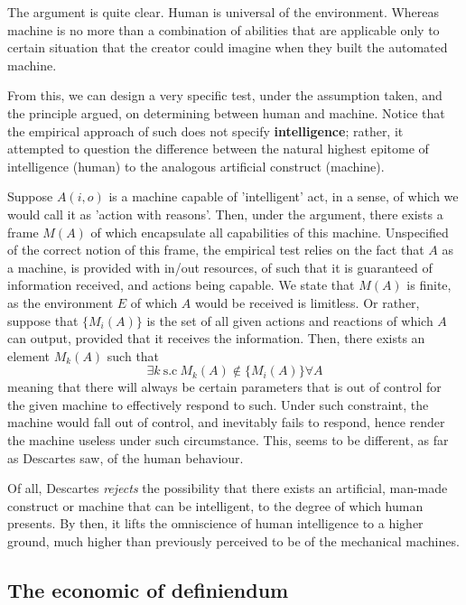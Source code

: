 The argument is quite clear. Human is universal of the environment. Whereas machine is no more than a combination of abilities that are applicable only to certain situation that the creator could imagine when they built the automated machine. 

From this, we can design a very specific test, under the assumption taken, and the principle argued, on determining between human and machine. Notice that the empirical approach of such does not specify \textbf{intelligence}; rather, it attempted to question the difference between the natural highest epitome of intelligence (human) to the analogous artificial construct (machine). 

Suppose $A(i,o)$ is a machine capable of 'intelligent' act, in a sense, of which we would call it as 'action with reasons'. Then, under the argument, there exists a frame $M(A)$ of which encapsulate all capabilities of this machine. Unspecified of the correct notion of this frame, the empirical test relies on the fact that $A$ as a machine, is provided with in/out resources, of such that it is guaranteed of information received, and actions being capable. We state that $M(A)$ is finite, as the environment $E$ of which $A$ would be received is limitless. Or rather, suppose that $\{M_{i}(A)\}$ is the set of all given actions and reactions of which $A$ can output, provided that it receives the information. Then, there exists an element $M_{k}(A)$ such that $$\exists k \: \text{s.c}\:M_{k}(A)\notin \{M_{i}(A)\}\forall A$$ meaning that there will always be certain parameters that is out of control for the given machine to effectively respond to such. Under such constraint, the machine would fall out of control, and inevitably fails to respond, hence render the machine useless under such circumstance. This, seems to be different, as far as Descartes saw, of the human behaviour. 

Of all, Descartes \textit{rejects} the possibility that there exists an artificial, man-made construct or machine that can be intelligent, to the degree of which human presents. By then, it lifts the omniscience of human intelligence to a higher ground, much higher than previously perceived to be of the mechanical machines. 

\subsection{The economic of definiendum} 


